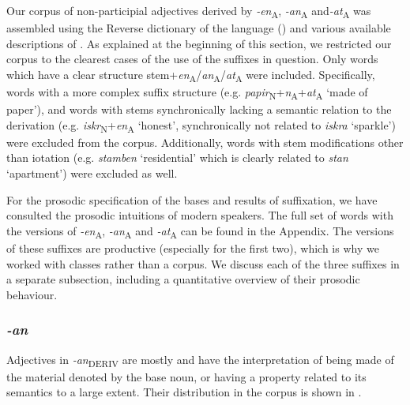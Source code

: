 \documentclass[output=paper, colorlinks, citecolor=brown, newtxmath]{langsci/langscibook}
\begin{document}
Our corpus of non-participial adjectives derived by  \textit{{-en}}\textsubscript{A}, \textit{{-an}}\textsubscript{A} and\textit{ {-at}}\textsubscript{A} was assembled using the Reverse dictionary of the  language (\citealt{Nik2000}) and various available descriptions of  \citep{Bab2002, Ste1979, Bar1995}.
As explained at the beginning of this section, we restricted our corpus to the clearest cases of the use of the suffixes in question. Only words which have a clear structure stem+\textit{en}\textsubscript{A}/\textit{an}\textsubscript{A}/\textit{at}\textsubscript{A} were included. Specifically, words with a more complex suffix structure (e.g. \textit{papir}\textsubscript{N}+\textit{n}\textsubscript{A}+\textit{at}\textsubscript{A} `made of paper'), and words with stems synchronically lacking a semantic relation to the derivation (e.g. \textit{iskr}\textsubscript{N}+\textit{en}\textsubscript{A} `honest', synchronically not related to \textit{iskra} `sparkle') were excluded from the corpus. Additionally, words with stem modifications other than iotation (e.g. \textit{stamben} `residential' which is clearly related to \textit{stan} `apartment') were excluded as well.

\largerpage
For the prosodic specification of the bases and results of suffixation, we have consulted the prosodic intuitions of modern  speakers. The full set of words with the  versions of \textit{-en}\textsubscript{A}, \textit{-an}\textsubscript{A} and \textit{-at}\textsubscript{A} can be found in the Appendix. The  versions of these suffixes are productive (especially for the first two), which is why we worked with  classes rather than a corpus.
We discuss each of the three suffixes in a separate subsection, including a quantitative overview of their prosodic behaviour.

\subsubsection{\textit{-an}}\label{sec:simonovic:421}
Adjectives in \textit{-an}\textsubscript{DERIV} are mostly  and have the interpretation of being made of the material denoted by the base noun, or having a property related to its semantics to a large extent. Their distribution in the corpus is shown in .
\end{document}
